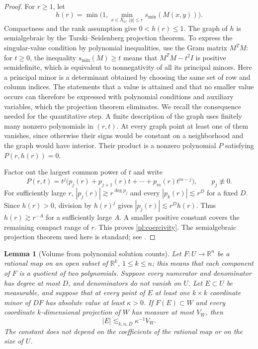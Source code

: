 \documentclass[11pt]{amsart}
\newtheorem{lemma}[theorem]{Lemma}
\theoremstyle{definition}
\theoremstyle{remark}
\newcommand{\R}{\mathbb R}
\numberwithin{equation}{section}
\begin{document}
\begin{proof}
For $r\ge1$, let
\[
h(r)=\min\bigl(1,\min_{x\in X_0,\ |y|\le r}s_{\min}(M(x,y))\bigr).
\]
Compactness and the rank assumption give $0<h(r)\le1$. The graph of $h$ is semialgebraic by the Tarski--Seidenberg projection theorem. To express the singular-value condition by polynomial inequalities, use the Gram matrix $M^TM$: for $t\ge0$, the inequality $s_{\min}(M)\ge t$ means that $M^TM-t^2I$ is positive semidefinite, which is equivalent to nonnegativity of all its principal minors. Here a principal minor is a determinant obtained by choosing the same set of row and column indices. The statements that a value is attained and that no smaller value occurs can therefore be expressed with polynomial conditions and auxiliary variables, which the projection theorem eliminates. We recall the consequence needed for the quantitative step. A finite description of the graph uses finitely many nonzero polynomials in $(r,t)$. At every graph point at least one of them vanishes, since otherwise their signs would be constant on a neighborhood and the graph would have interior. Their product is a nonzero polynomial $P$ satisfying $P(r,h(r))=0$.

Factor out the largest common power of $t$ and write
\[
P(r,t)=t^j\bigl(p_j(r)+p_{j+1}(r)t+\cdots+p_m(r)t^{m-j}\bigr),
\qquad p_j\not\equiv0.
\]
For sufficiently large $r$, $|p_j(r)|\gtrsim r^{\deg p_j}$ and every $|p_k(r)|\lesssim r^D$ for a fixed $D$. Since $h(r)>0$, division by $h(r)^j$ gives $|p_j(r)|\lesssim r^D h(r)$. Thus $h(r)\gtrsim r^{-A}$ for a sufficiently large $A$. A smaller positive constant covers the remaining compact range of $r$. This proves \eqref{pl:coercivity}. The semialgebraic projection theorem used here is standard; see \cite{BPR}.
\end{proof}

\begin{lemma}[Volume from polynomial solution counts]\label{pl:rational-volume}
Let $F:U\to\R^n$ be a rational map on an open subset of $\R^k$, $1\le k\le n$; this means that each component of $F$ is a quotient of two polynomials. Suppose every numerator and denominator has degree at most $D$, and denominators do not vanish on $U$. Let $E\subset U$ be measurable, and suppose that at every point of $E$ at least one $k\times k$ coordinate minor of $DF$ has absolute value at least $\kappa>0$. If $F(E)\subset W$ and every coordinate $k$-dimensional projection of $W$ has measure at most $V_W$, then
\begin{equation}\label{pl:rational-volume-bound}
|E|\lesssim_{k,n,D} \kappa^{-1}V_W.
\end{equation}
The constant does not depend on the coefficients of the rational map or on the size of $U$.
\end{lemma}
\end{document}
